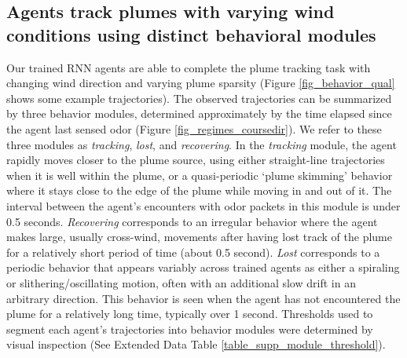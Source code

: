 \documentclass[5p,twocolumn,authoryear]{elsarticle}
\begin{document}
\subsection*{Agents track plumes with varying wind conditions using distinct behavioral modules}
\label{sec_behavior_qual}

Our trained RNN agents are able to complete the plume tracking task with changing wind direction and varying plume sparsity
(Figure \ref{fig_behavior_qual} shows some example trajectories). 
The observed trajectories can be summarized by three behavior modules, determined approximately by the time elapsed since the agent last sensed odor (Figure \ref{fig_regimes_coursedir}). 
We refer to these three modules as \textit{tracking}, \textit{lost}, and \textit{recovering}. 
In the \textit{tracking} module, the agent rapidly moves closer to the plume source, using either straight-line trajectories when it is well within the plume, or a quasi-periodic `plume skimming' behavior where it stays close to the edge of the plume while moving in and out of it. 
The interval between the agent's encounters with odor packets in this module is under 0.5 seconds.
\textit{Recovering} corresponds to an irregular behavior where the agent makes large, usually cross-wind, movements after having lost track of the plume for a relatively short period of time (about 0.5 second).
\textit{Lost} corresponds to a periodic behavior that appears variably across trained agents as either a spiraling or slithering/oscillating motion, often with an additional slow drift in an arbitrary direction.
This behavior is seen when the agent has not encountered the plume for a relatively long time, typically over 1 second.
Thresholds used to segment each agent's trajectories into behavior modules were determined by visual inspection (See Extended Data Table \ref{table_supp_module_threshold}). 
\end{document}
